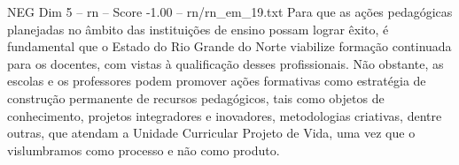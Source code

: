 \begin{textsample}{NEG Dim 5 – rn – Score -1.00 – rn/rn\_em\_19.txt}
Para que as ações pedagógicas planejadas no âmbito das instituições de ensino possam lograr êxito, é fundamental que o Estado do Rio Grande do Norte viabilize formação continuada para os docentes, com vistas à qualificação desses profissionais.
Não obstante, as escolas e os professores podem promover ações formativas como estratégia de construção permanente de recursos pedagógicos, tais como objetos de conhecimento, projetos integradores e inovadores, metodologias criativas, dentre outras, que atendam a Unidade Curricular Projeto de Vida, uma vez que o vislumbramos como processo e não como produto.

\end{textsample}
